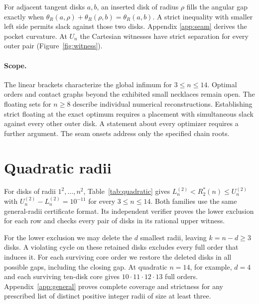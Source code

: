 \documentclass[11pt]{article}
\theoremstyle{definition}
\theoremstyle{remark}
\begin{document}
For adjacent tangent disks $a,b$, an inserted disk of radius $\rho$ fills
the angular gap exactly when
$\theta_R(a,\rho)+\theta_R(\rho,b)=\theta_R(a,b)$. A strict inequality
with smaller left side permits slack against those two disks. Appendix
\ref{app:seam} derives the pocket curvature. At $U_n$ the Cartesian
witnesses have strict separation for every outer pair (Figure~\ref{fig:witness}).

\paragraph{Scope.} The linear brackets characterize the global infimum for
$3\le n\le14$. Optimal orders and contact graphs beyond the exhibited
small necklaces remain open. The floating sets for $n\ge8$ describe
individual numerical reconstructions. Establishing strict floating at the
exact optimum requires a placement with simultaneous slack against every
other outer disk. A statement about every optimizer requires a further
argument. The seam onsets address only the specified chain roots.

\clearpage
\section{Quadratic radii}\label{sec:quadratic}
For disks of radii $1^2,\ldots,n^2$, Table~\ref{tab:quadratic} gives
$L_n^{(2)}<R_2^*(n)\le U_n^{(2)}$ with $U_n^{(2)}-L_n^{(2)}=10^{-11}$
for every $3\le n\le14$. Both families use the same general-radii
certificate format. Its independent verifier proves the lower exclusion
for each row and checks every pair of disks in its rational upper witness.

For the lower exclusion we may delete the $d$ smallest radii, leaving
$k=n-d\ge3$ disks. A violating cycle on these retained disks excludes
every full order that induces it. For each surviving core order we restore
the deleted disks in all possible gaps, including the closing gap. At
quadratic $n=14$, for example, $d=4$ and each surviving ten-disk core
gives $10\cdot11\cdot12\cdot13$ full orders. Appendix~\ref{app:general}
proves complete coverage and strictness for any prescribed list of distinct
positive integer radii of size at least three.

\begin{table}[!htbp]\centering
\caption{Certified global brackets for quadratic radii. The endpoints are
exact rationals. Each witness gives a feasible placement at $U_n^{(2)}$.}
\label{tab:quadratic}

\end{table}
\end{document}
